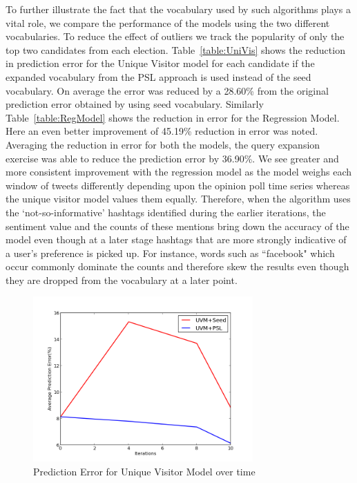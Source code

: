 To further illustrate the fact that the vocabulary used by such algorithms plays a vital role, we compare the performance of the models using the two different vocabularies.
To reduce the effect of outliers we track the popularity of only the top two candidates from each election.
Table~\ref{table:UniVis} shows the reduction in prediction error for the Unique Visitor model for each candidate if the expanded vocabulary from the PSL approach is used instead of the seed vocabulary.
On average the error was reduced by a 28.60\% from the original prediction error obtained by using seed vocabulary.
Similarly Table~\ref{table:RegModel} shows the reduction in error for the Regression Model.
Here an even better improvement of 45.19\% reduction in error was noted.
Averaging the reduction in error for both the models, the query expansion exercise was able to reduce the prediction error by  36.90\%.
We see greater and more consistent improvement with the regression model as the model weighs each window of tweets differently 
depending upon the opinion poll time series whereas the unique visitor model values them equally. 
Therefore, when the algorithm uses the `not-so-informative' hashtags identified during 
the earlier iterations, the sentiment value and the counts of these mentions bring down the accuracy of the model even though 
at a later stage hashtags that are more strongly indicative of a user's preference is picked up.
For instance, words such as ``facebook" which occur commonly dominate the counts and therefore skew the 
results even though they are dropped from the vocabulary at a later point.
\begin{figure}
	\centering
	\includegraphics[width=0.75\textwidth, height=0.3\textheight]{support_files/UVMevolution.png}
	\caption{Prediction Error for Unique Visitor Model over time}
	\label{fig:uvmEvolution}
\end{figure}
